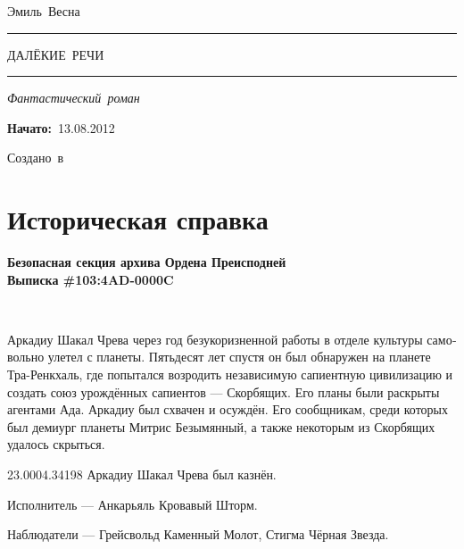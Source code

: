 \documentclass[a4paper,12pt,fleqn]{book}\usepackage{polyglossia}\setdefaultlanguage[babelshorthands=true]{russian}\setotherlanguage{english}\defaultfontfeatures{Ligatures=TeX,Mapping=tex-text}\usepackage{xcolor}\newcommand{\ml}[3]{#2}
\newcommand{\tofaauthor}{\ml{$0$}{Эмиль~Весна}{Emil~Viesn\'{a}}}
\newcommand{\tofatitle}{\ml{$0$}{ДАЛЁКИЕ~РЕЧИ}{Talks~of~Faraway}}
\newcommand{\tofastarted}{13.08.2012}
\newcommand{\asterism}{\vspace{1em}{\centering\Large\bfseries$\ast~\ast~\ast$\par}\vspace{1em}}
\begin{document}

\begin{titlepage}
{\centering{~\par}\vspace{0.25\textheight}
{\LARGE\tofaauthor}\par
\vspace{1.0cm}\rule{17em}{1pt}\par\vspace{0.3cm}
{\Huge\textsc{\tofatitle}\par}
\vspace{0.3cm}\rule{17em}{2pt}\par\vspace{1.0cm}
{\Large\textit{\ml{$0$}{Фантастический~роман}{Science~fiction}}\par}
\vspace{0.5cm}\asterism\par\vspace{1.0cm}
{\textbf{\ml{$0$}{Начато:}{Started:}}~\tofastarted\par}\vfill
{\Large\ml{$0$}{Создано~в}{Created~by}~\XeLaTeX}\par}
\end{titlepage}

\tableofcontents

\chapter*{Историческая справка}

\textbf{Безопасная секция архива Ордена Преисподней\\
Выписка \#103:4AD-0000C}

~

Аркадиу Шакал Чрева через год безукоризненной работы в отделе культуры самовольно улетел с планеты.
Пятьдесят лет спустя он был обнаружен на планете Тра-Ренкхаль, где попытался возродить независимую сапиентную цивилизацию и создать союз урождённых сапиентов --- Скорбящих.
Его планы были раскрыты агентами Ада.
Аркадиу был схвачен и осуждён.
Его сообщникам, среди которых был демиург планеты Митрис Безымянный, а также некоторым из Скорбящих удалось скрыться.

23.0004.34198 Аркадиу Шакал Чрева был казнён.

Исполнитель --- Анкарьяль Кровавый Шторм.

Наблюдатели --- Грейсвольд Каменный Молот, Стигма Чёрная Звезда.
\end{document}
